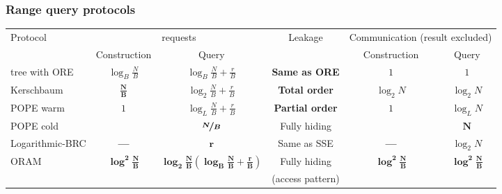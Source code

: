 	\begin{frame}[label={frame:appendix:protocols}]

		\frametitle{Range query protocols}

		\begin{table}
			\begin{adjustbox}{width=\linewidth}
				\begin{tabular}{ l c c c c c }

					\toprule

					\multirow{2}{*}{Protocol}						& \multicolumn{2}{c}{ {\IO} requests}																													& \multirow{2}{*}{ Leakage}	& \multicolumn{2}{c}{ Communication (result excluded)}													\\ \cline{2-3} \cline{5-6}
					\rule{0pt}{10pt}								& Construction										& Query																								&							& Construction										& Query 											\\

					\toprule

					{\BPlus} tree with ORE							& $\log_B \frac{N}{B}$								& $\log_B \frac{N}{B} + \frac{r}{B}$																& \textbf{Same as ORE}		& $1$												& $1$												\\
					\midrule

					Kerschbaum \cite{florian-protocol}				& $\bm{\frac{N}{B}}$								& $\log_2 \frac{N}{B} + \frac{r}{B}$																& \textbf{Total order}		& $\log_2 N$										& $\log_2 N$										\\

					\midrule

					POPE \cite{pope} warm							& \multirow{2}{*}{ $1$}								& $\log_L \frac{N}{B} + \frac{r}{B}$																& \textbf{Partial order}	& \multirow{2}{*}{ $1$}								& $\log_L N$										\\

					POPE \cite{pope} cold							& 													& $\bm{{\nicefrac{N}{B}}}$																			& Fully hiding				& 													& $\bm{N}$											\\

					\midrule

					Logarithmic-BRC \cite{practical-range-search}	& \textbf{---}										& $\bm{r}$																							& Same as SSE				& \textbf{---}										& $\log_2 N$										\\

					\midrule

					\multirow{2}{*}{ORAM}							& \multirow{2}{*}{ $\bm{{ \log^2 \frac{N}{B} }}$}	& \multirow{2}{*}{ $\bm{{ \log_2 \frac{N}{B} \left( \log_B \frac{N}{B} + \frac{r}{B} \right) }}$}	& Fully hiding				& \multirow{2}{*}{ $\bm{{ \log^2 \frac{N}{B} }}$}	& \multirow{2}{*}{ $\bm{{ \log^2 \frac{N}{B} }}$}	\\
																	&													&																									& (access pattern)			&													&													\\


\end{tabular}
\end{adjustbox}
\end{table}
\end{frame}
